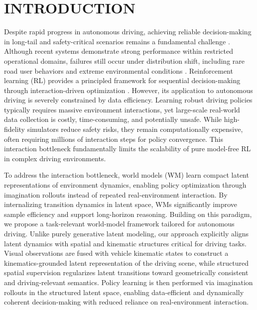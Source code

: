 \section{INTRODUCTION}

Despite rapid progress in autonomous driving, achieving reliable decision-making in long-tail and safety-critical scenarios remains a fundamental challenge \cite{kuznietsov2024explainable}. Although recent systems demonstrate strong performance within restricted operational domains, failures still occur under distribution shift, including rare road user behaviors and extreme environmental conditions \cite{xu2025wod}.
Reinforcement learning (RL) provides a principled framework for sequential decision-making through interaction-driven optimization \cite{zhao2024survey}. However, its application to autonomous driving is severely constrained by data efficiency. Learning robust driving policies typically requires massive environment interactions, yet large-scale real-world data collection is costly, time-consuming, and potentially unsafe. While high-fidelity simulators reduce safety risks, they remain computationally expensive, often requiring millions of interaction steps for policy convergence. This interaction bottleneck fundamentally limits the scalability of pure model-free RL in complex driving environments.


To address the interaction bottleneck, world models (WM) learn compact latent representations of environment dynamics, enabling policy optimization through imagination rollouts instead of repeated real-environment interaction. By internalizing transition dynamics in latent space, WMs significantly improve sample efficiency and support long-horizon reasoning.
Building on this paradigm, we propose a task-relevant world-model framework tailored for autonomous driving. Unlike purely generative latent modeling, our approach explicitly aligns latent dynamics with spatial and kinematic structures critical for driving tasks. Visual observations are fused with vehicle kinematic states to construct a kinematics-grounded latent representation of the driving scene, while structured spatial supervision regularizes latent transitions toward geometrically consistent and driving-relevant semantics. Policy learning is then performed via imagination rollouts in the structured latent space, enabling data-efficient and dynamically coherent decision-making with reduced reliance on real-environment interaction.

